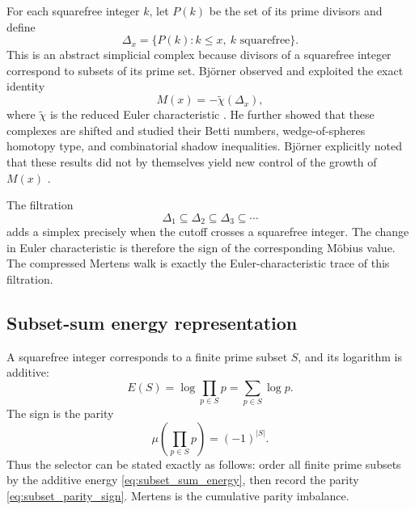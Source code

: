 \documentclass[11pt]{amsart}
\numberwithin{equation}{section}
\theoremstyle{plain}
\theoremstyle{definition}
\theoremstyle{remark}
\newcommand{\Mob}{\mu}
\newcommand{\Mert}{M}
\begin{document}
For each squarefree integer $k$, let $P(k)$ be the set of its prime divisors and define
\begin{equation}
\Delta_x
=
\{P(k): k\le x,\ k\text{ squarefree}\}.
\label{eq:bjorner_complex}
\end{equation}
This is an abstract simplicial complex because divisors of a squarefree integer correspond to subsets of its prime set.  Bj\"orner observed and exploited the exact identity
\begin{equation}
\Mert(x)
=
-\widetilde\chi(\Delta_x),
\label{eq:mertens_euler_characteristic}
\end{equation}
where $\widetilde\chi$ is the reduced Euler characteristic \cite{Bjorner2011}.  He further showed that these complexes are shifted and studied their Betti numbers, wedge-of-spheres homotopy type, and combinatorial shadow inequalities.  Bj\"orner explicitly noted that these results did not by themselves yield new control of the growth of $\Mert(x)$ \cite{Bjorner2011}.

The filtration
\begin{equation}
\Delta_1\subseteq\Delta_2\subseteq\Delta_3\subseteq\cdots
\label{eq:simplicial_filtration}
\end{equation}
adds a simplex precisely when the cutoff crosses a squarefree integer.  The change in Euler characteristic is therefore the sign of the corresponding M\"obius value.  The compressed Mertens walk is exactly the Euler-characteristic trace of this filtration.

\subsection{Subset-sum energy representation}
\label{subsec:subset_sum_energy}

A squarefree integer corresponds to a finite prime subset $S$, and its logarithm is additive:
\begin{equation}
E(S)
=
\log\prod_{p\in S}p
=
\sum_{p\in S}\log p.
\label{eq:subset_sum_energy}
\end{equation}
The sign is the parity
\begin{equation}
\Mob\!\left(\prod_{p\in S}p\right)
=
(-1)^{|S|}.
\label{eq:subset_parity_sign}
\end{equation}
Thus the selector can be stated exactly as follows: order all finite prime subsets by the additive energy \eqref{eq:subset_sum_energy}, then record the parity \eqref{eq:subset_parity_sign}.  Mertens is the cumulative parity imbalance.
\end{document}
